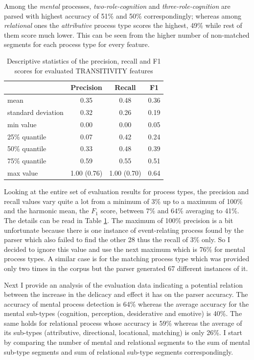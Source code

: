     Among the \textit{mental} processes, \textit{two-role-cognition} and \textit{three-role-cognition} are parsed with highest accuracy of 51\% and 50\% correspondingly; whereas among \textit{relational} ones the \textit{attributive} process type scores the highest, 49\% while rest of them score much lower. This can be seen from the higher number of  non-matched segments for each process type for every feature.     
    
    \begin{table}[!ht]
    \centering
    \begin{tabular}{lccc}
        \toprule
        {} & {Precision} & {Recall} & {F1} \\ %
        \midrule
        mean & 0.35 & 0.48 & 0.36 \\
        standard deviation & 0.32 & 0.26 & 0.19 \\
        min value & 0.00 & 0.00 & 0.05 \\
        25\% quantile & 0.07 & 0.42 & 0.24 \\
        50\% quantile & 0.33 & 0.48 & 0.39 \\
        75\% quantile & 0.59 & 0.55 & 0.51 \\
        max value & 1.00 (0.76) & 1.00 (0.70) & 0.64 \\
        \bottomrule
    \end{tabular}
    \caption{Descriptive statistics of the precision, recall and F1 scores for evaluated TRANSITIVITY features}
    \label{tab:transitivity-accuracy}
    \end{table}
    
    Looking at the entire set of evaluation results for process types, the precision and recall values vary quite a lot from a minimum of 3\% up to a maximum of 100\% and the harmonic mean, the $F_1$ score, between 7\% and 64\%  averaging to 41\%. The details can be read in Table \ref{tab:transitivity-accuracy}. The maximum of 100\% precision is a bit unfortunate because there is one instance of event-relating process found by the parser which also failed to find the other 28 thus the recall of 3\% only. So I decided to ignore this value and use the next maximum which is 76\% for mental process types. A similar case is for the matching process type which was provided only two times in the corpus but the parser generated 67 different instances of it.
    
    Next I provide an analysis of the evaluation data indicating a potential relation between the increase in the delicacy and effect it has on the parser accuracy. The accuracy of mental process detection is 64\% whereas the average accuracy for the mental sub-types (cognition, perception, desiderative and emotive) is 40\%. The same holds for relational process whose accuracy is 59\% whereas the average of its sub-types (attributive, directional, locational, matching) is only 26\%. I start by comparing the number of mental and relational segments to the sum of mental sub-type segments and sum of relational sub-type segments correspondingly. 
    
